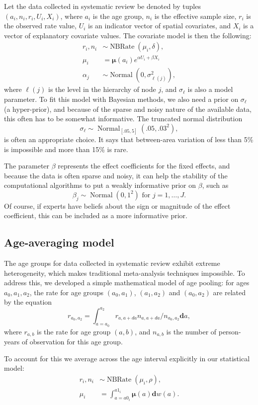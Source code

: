 \documentclass[12pt]{article}
\newcommand{\1}{\mathbf{1}}
\newcommand{\0}{\mathbf{0}}
\renewcommand{\d}{\mathbf{d}}
\newcommand{\Normal}{\operatorname{Normal}}
\newcommand{\NBRate}{\operatorname{NBRate}}
\def\boldmu{\boldsymbol{\mu}}
\begin{document}
Let the data collected in systematic review be denoted by tuples
$\left(a_i, n_i, r_i, U_i, X_i\right)$, where $a_i$ is the age group,
$n_i$ is the effective sample size, $r_i$ is the observed rate value,
$U_i$ is an indicator vector of spatial covariates, and $X_i$ is a
vector of explanatory covariate values. The covariate model is then
the following:
\begin{align*}
r_i, n_i &\sim \NBRate\left(\mu_i, \delta\right),\\
\mu_i &= \boldmu(a_i)e^{\alpha U_i+\beta X_i}\\
\alpha_j &\sim \Normal\left(0, \sigma_{\ell(j)}^2\right),
\end{align*}
where $\ell(j)$ is the level in the hierarchy of node $j$, and
$\sigma_\ell$ is also a model parameter. To fit this model with
Bayesian methods, we also need a prior on $\sigma_\ell$ (a
hyper-prior), and because of the sparse and noisy nature of the
available data, this often has to be somewhat informative.  The
truncated normal distribution
\[
\sigma_\ell \sim \Normal_{[.05,5]}\left(.05, .03^2\right),
\]
is often an appropriate choice. It says that between-area variation of
less than 5\% is impossible and more than 15\% is rare.

The parameter $\beta$ represents the effect coefficients for
the fixed effects, and because the data is often sparse and noisy, it
can help the stability of the computational algorithms to put a weakly
informative prior on $\beta$, such as
\[
\beta_j \sim \Normal\left(0, 1^2\right) \text{ for } j = 1, \ldots, J.
\]
Of course, if experts have beliefs about the sign or magnitude of the
effect coefficient, this can be included as a more informative prior.


\subsection{Age-averaging model}
The age groups for data collected in systematic review exhibit extreme
heterogeneity, which makes traditional meta-analysis techniques
impossible.  To address this, we developed a simple mathematical model
of age pooling:
for ages $a_0, a_1, a_2$, the rate for age groups $(a_0,a_1)$, $(a_1, a_2)$ and $(a_0, a_2)$ are related by the equation
\[
r_{a_0,a_2} = \int_{a=a_0}^{a_2} r_{a,a+da}n_{a,a+da}/n_{a_0,a_2}\d a,
\]
where $r_{a,b}$ is the rate for age group $(a,b)$, and $n_{a,b}$ is
the number of person-years of observation for this age group.

To account for this we average across the age interval explicitly in
our statistical model:
\begin{align*}
r_i, n_i &\sim \NBRate\left(\mu_i, \rho\right),\\
\mu_i &= \int_{a=a0_i}^{a1_i} \boldmu(a)\d w(a).
\end{align*}
\end{document}

